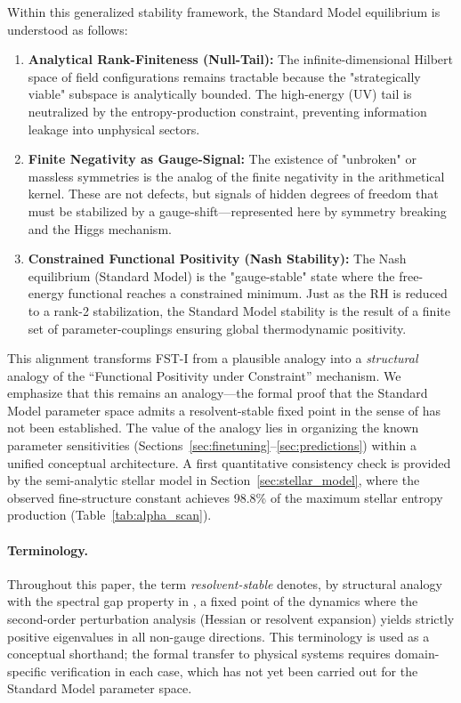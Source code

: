 \documentclass[12pt,a4paper]{article}
\theoremstyle{remark}
\begin{document}
Within this generalized stability framework, the Standard Model equilibrium is understood as follows:
\begin{enumerate}[label=\alph*)]
    \item \textbf{Analytical Rank-Finiteness (Null-Tail):} The infinite-dimensional Hilbert space of field configurations remains tractable because the "strategically viable" subspace is analytically bounded. The high-energy (UV) tail is neutralized by the entropy-production constraint, preventing information leakage into unphysical sectors.
    \item \textbf{Finite Negativity as Gauge-Signal:} The existence of "unbroken" or massless symmetries is the analog of the finite negativity in the arithmetical kernel. These are not defects, but signals of hidden degrees of freedom that must be stabilized by a gauge-shift—represented here by symmetry breaking and the Higgs mechanism.
    \item \textbf{Constrained Functional Positivity (Nash Stability):} The Nash equilibrium (Standard Model) is the "gauge-stable" state where the free-energy functional reaches a constrained minimum. Just as the RH is reduced to a rank-2 stabilization, the Standard Model stability is the result of a finite set of parameter-couplings ensuring global thermodynamic positivity.
\end{enumerate}

This alignment transforms FST-I from a plausible analogy into a \emph{structural} analogy of the ``Functional Positivity under Constraint'' mechanism. We emphasize that this remains an analogy---the formal proof that the Standard Model parameter space admits a resolvent-stable fixed point in the sense of \citep{GeigerRH2026b} has not been established. The value of the analogy lies in organizing the known parameter sensitivities (Sections~\ref{sec:finetuning}--\ref{sec:predictions}) within a unified conceptual architecture. A first quantitative consistency check is provided by the semi-analytic stellar model in Section~\ref{sec:stellar_model}, where the observed fine-structure constant achieves 98.8\% of the maximum stellar entropy production (Table~\ref{tab:alpha_scan}).

\paragraph{Terminology.} Throughout this paper, the term \emph{resolvent-stable} denotes, by structural analogy with the spectral gap property in \citep{GeigerRH2026b}, a fixed point of the dynamics where the second-order perturbation analysis (Hessian or resolvent expansion) yields strictly positive eigenvalues in all non-gauge directions. This terminology is used as a conceptual shorthand; the formal transfer to physical systems requires domain-specific verification in each case, which has not yet been carried out for the Standard Model parameter space.
\end{document}
